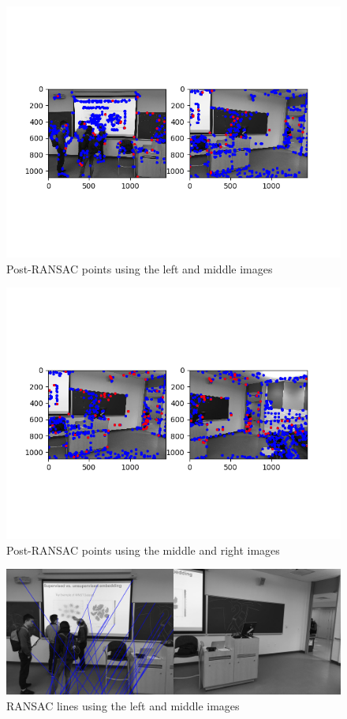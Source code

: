 \documentclass[10pt]{article}
\begin{document}
	\begin{figure}[h]
		\caption{Post-RANSAC points using the left and middle images}
		\centering
		\includegraphics{postRANSACl2m.png}
	\end{figure}
	
	\begin{figure}[h]
		\caption{Post-RANSAC points using the middle and right images}
		\centering
		\includegraphics{postRANSACm2r.png}
	\end{figure}
	
	\begin{figure}[h]
		\caption{RANSAC lines using the left and middle images}
		\centering
		\includegraphics[scale=0.125]{matches_l2m.png}
	\end{figure}
	
\end{document}
